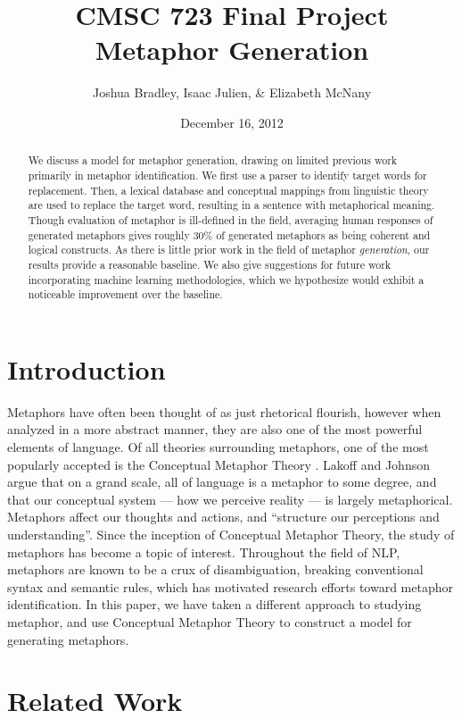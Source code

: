 \documentclass[12pt]{article}
\title{CMSC 723 Final Project\\
Metaphor Generation}
\author{Joshua Bradley, Isaac Julien, \& Elizabeth McNany}
\date{December 16, 2012}
\begin{document}
\maketitle

\begin{abstract}
We discuss a model for metaphor generation, drawing on limited previous work primarily in metaphor identification.  We first use a parser to identify target words for replacement.  Then, a lexical database and conceptual mappings from linguistic theory are used to replace the target word, resulting in a sentence with metaphorical meaning.  Though evaluation of metaphor is ill-defined in the field, averaging human responses of generated metaphors gives roughly 30\% of generated metaphors as being coherent and logical constructs.  As there is little prior work in the field of metaphor \emph{generation}, our results provide a reasonable baseline. We also give suggestions for future work incorporating machine learning methodologies, which we hypothesize would exhibit a noticeable improvement over the baseline.
\end{abstract}

\newpage
\tableofcontents
\newpage

\section{Introduction}

Metaphors have often been thought of as just rhetorical flourish, however when analyzed in a more abstract manner, they are also one of the most powerful elements of language. Of all theories surrounding metaphors, one of the most popularly accepted is the Conceptual Metaphor Theory \cite{lakoff80}. Lakoff and Johnson argue that on a grand scale, all of language is a metaphor to some degree, and that our conceptual system --- how we perceive reality --- is largely metaphorical. Metaphors affect our thoughts and actions, and ``structure our perceptions and understanding''. Since the inception of Conceptual Metaphor Theory, the study of metaphors has become a topic of interest. Throughout the field of NLP, metaphors are known to be a crux of disambiguation, breaking conventional syntax and semantic rules, which has motivated research efforts toward metaphor identification.  In this paper, we have taken a different approach to studying metaphor, and use Conceptual Metaphor Theory to construct a model for generating metaphors.

\section{Related Work}
\end{document}
